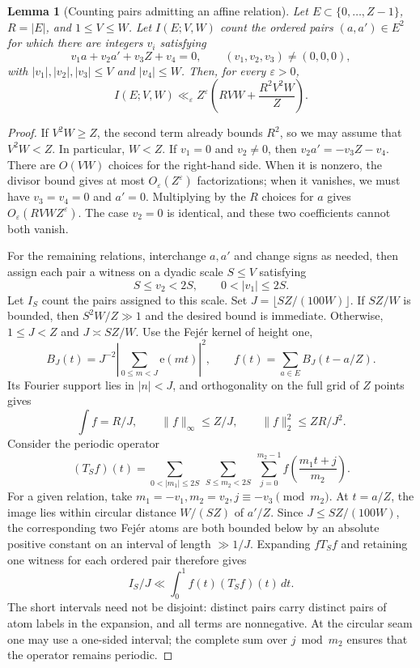 \documentclass[11pt,a4paper]{article}
\theoremstyle{paperplain}
\newtheorem{lemma}[theorem]{Lemma}
\numberwithin{equation}{section}
\begin{document}
\begin{lemma}[Counting pairs admitting an affine relation]\label{geo:incidence}
Let $E\subset\{0,\ldots,Z-1\}$, $R=|E|$, and $1\le V\le W$.
Let $I(E;V,W)$ count the ordered pairs $(a,a')\in E^2$ for which there are
integers $v_i$ satisfying
\[
 v_1a+v_2a'+v_3Z+v_4=0,\qquad (v_1,v_2,v_3)\ne(0,0,0),
\]
with $|v_1|,|v_2|,|v_3|\le V$ and $|v_4|\le W$.
Then, for every $\varepsilon>0$,
\begin{equation}\label{geo:incidence-bound}
 I(E;V,W)\ll_\varepsilon
 Z^\varepsilon\left(RVW+\frac{R^2V^2W}{Z}\right).
\end{equation}
\end{lemma}

\begin{proof}
If $V^2W\ge Z$, the second term already bounds $R^2$, so we may assume that
$V^2W<Z$. In particular, $W<Z$. If $v_1=0$ and $v_2\ne0$, then
$v_2a'=-v_3Z-v_4$.
There are $O(VW)$ choices for the right-hand side. When it is nonzero, the
divisor bound gives at most $O_\varepsilon(Z^\varepsilon)$ factorizations;
when it vanishes, we must have $v_3=v_4=0$ and $a'=0$.
Multiplying by the $R$ choices for $a$ gives
$O_\varepsilon(RVWZ^\varepsilon)$. The case $v_2=0$ is identical,
and these two coefficients cannot both vanish.

For the remaining relations, interchange $a,a'$ and change signs as needed,
then assign each pair a witness on a dyadic scale $S\le V$ satisfying
\[
 S\le v_2<2S,\qquad 0<|v_1|\le2S.
\]
Let $I_S$ count the pairs assigned to this scale.
Set $J=\lfloor SZ/(100W)\rfloor$.
If $SZ/W$ is bounded, then $S^2W/Z\gg1$ and the desired bound is immediate.
Otherwise, $1\le J<Z$ and $J\asymp SZ/W$. Use the Fej\'er kernel of height one,
\[
 B_J(t)=J^{-2}\left|\sum_{0\le m<J}\mathrm e(mt)\right|^2,
 \qquad f(t)=\sum_{a\in E}B_J(t-a/Z).
\]
Its Fourier support lies in $|n|<J$, and orthogonality on the full grid of
$Z$ points gives
\begin{equation}\label{geo:fejer-norms}
 \int f=R/J,\qquad \|f\|_\infty\le Z/J,
 \qquad \|f\|_2^2\le ZR/J^2.
\end{equation}
Consider the periodic operator
\begin{equation}\label{geo:periodic-operator}
 (T_Sf)(t)=
 \sum_{0<|m_1|\le2S}\ \sum_{S\le m_2<2S}
 \ \sum_{j=0}^{m_2-1}f\left(\frac{m_1t+j}{m_2}\right).
\end{equation}
For a given relation, take $m_1=-v_1,m_2=v_2,j\equiv-v_3\pmod {m_2}$.
At $t=a/Z$, the image lies within circular distance $W/(SZ)$ of $a'/Z$.
Since $J\le SZ/(100W)$, the corresponding two Fej\'er atoms are both bounded
below by an absolute positive constant on an interval of length $\gg1/J$.
Expanding $fT_Sf$ and retaining one witness for each ordered pair therefore gives
\begin{equation}\label{geo:positive-witness}
 I_S/J\ll\int_0^1 f(t)(T_Sf)(t)\,dt.
\end{equation}
The short intervals need not be disjoint: distinct pairs carry distinct
pairs of atom labels in the expansion, and all terms are nonnegative.
At the circular seam one may use a one-sided interval; the complete sum over
$j\bmod m_2$ ensures that the operator remains periodic.


\end{proof}
\end{document}
